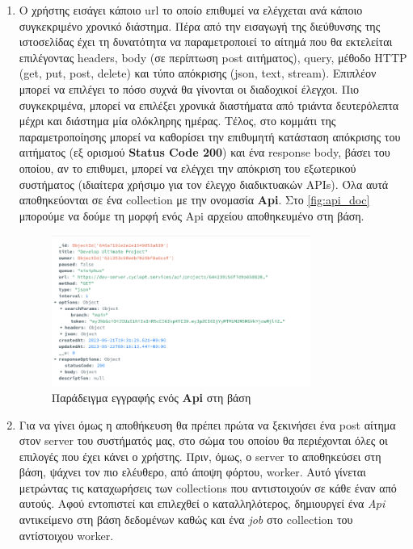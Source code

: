 \begin{enumerate}
	\item Ο χρήστης εισάγει κάποιο url το οποίο επιθυμεί να ελέγχεται ανά κάποιο συγκεκριμένο χρονικό διάστημα.
		Πέρα από την εισαγωγή της διεύθυνσης της ιστοσελίδας έχει τη δυνατότητα να παραμετροποιεί το αίτημά που θα
		εκτελείται επιλέγοντας headers, body (σε περίπτωση post αιτήματος), query, μέθοδο HTTP (get, put, post, delete) και τύπο απόκρισης (json, text, stream).
		Επιπλέον μπορεί να επιλέγει το πόσο συχνά θα γίνονται οι διαδοχικοί έλεγχοι.
		Πιο συγκεκριμένα, μπορεί να επιλέξει χρονικά διαστήματα από τριάντα δευτερόλεπτα μέχρι και διάστημα μία ολόκληρης ημέρας.
		Τέλος, στο κομμάτι της παραμετροποίησης μπορεί να καθορίσει την επιθυμητή κατάσταση απόκρισης του αιτήματος (εξ ορισμού \textbf{Status Code 200}) και ένα response body,
		βάσει του οποίου, αν το επιθυμει, μπορεί να ελέγχει την απόκριση του εξωτερικού συστήματος (ιδιαίτερα χρήσιμο για τον έλεγχο διαδικτυακών APIs).
		Όλα αυτά αποθηκεύονται σε ένα collection με την ονομασία \textbf{Api}. Στο \autoref{fig:api_doc} μπορούμε να δούμε τη μορφή ενός Api αρχείου αποθηκευμένο στη βάση. 
		\begin{figure}[!ht]
			\centering
			\includegraphics[width=0.8\textwidth]{./images/chapter4/api_doc.png}
			\caption[Παράδειγμα εγγραφής ενός \textbf{Api} στη βάση]{Παράδειγμα εγγραφής ενός \textbf{Api} στη βάση}
			\label{fig:api_doc}
		\end{figure}
	\item Για να γίνει όμως η αποθήκευση θα πρέπει πρώτα να ξεκινήσει ένα post αίτημα στον server του συστήματός μας, στο σώμα του οποίου
		θα περιέχονται όλες οι επιλογές που έχει κάνει ο χρήστης. Πριν, όμως, ο server το αποθηκεύσει στη βάση, ψάχνει τον πιο ελέυθερο, από 
		άποψη φόρτου, worker. Αυτό γίνεται μετρώντας τις καταχωρήσεις των collections που αντιστοιχούν σε κάθε έναν από αυτούς. Αφού εντοπιστεί 
		και επιλεχθεί ο καταλληλότερος, δημιουργεί ένα \textit{Api} αντικείμενο στη βάση δεδομένων καθώς και ένα \textit{job} στο collection του αντίστοιχου worker.

\end{enumerate}
